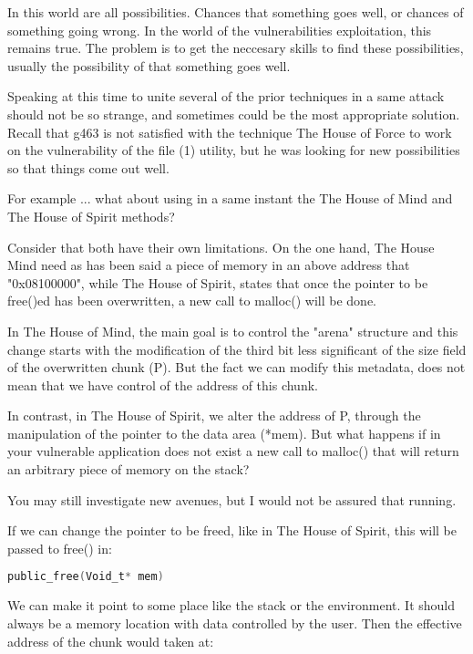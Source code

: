 \documentclass[12pt]{article}
\begin{document}
In this world are all possibilities. Chances that something goes well, or
chances of something going wrong. In the world of the vulnerabilities
exploitation, this remains true. The problem is to get the neccesary
skills to find these possibilities, usually the possibility of that
something goes well.
\newline


Speaking at this time to unite several of the prior techniques in a same
attack should not be so strange, and sometimes could be the most
appropriate solution. Recall that g463 is not satisfied with the technique
The House of Force to work on the vulnerability of the file (1) utility,
but he was looking for new possibilities so that things come out well.
\newline


For example ... what about using in a same instant the The House of Mind
and The House of Spirit methods?
\newline


Consider that both have their own limitations. On the one hand, The House
Mind need as has been said a piece of memory in an above address that
"0x08100000", while The House of Spirit, states that once the pointer to
be free()ed has been overwritten, a new call to malloc() will be done.
\newline


In The House of Mind, the main goal is to control the "arena" structure
and this change starts with the modification of the third bit less
significant of the size field of the overwritten chunk (P). But the fact
we can modify this metadata, does not mean that we have control of the
address of this chunk.
\newline


In contrast, in The House of Spirit, we alter the address of P, through
the manipulation of the pointer to the data area (*mem). But what happens
if in your vulnerable application does not exist a new call to malloc()
that will return an arbitrary piece of memory on the stack?
\newline


You may still investigate new avenues, but I would not be assured that
running.
\newline

If we can change the pointer to be freed, like in The House of Spirit,
this will be passed to free() in:
\begin{lstlisting}[language=C]
   public_free(Void_t* mem)
\end{lstlisting}
We can make it point to some place like the stack or the environment. It
should always be a memory location with data controlled by the user. Then
the effective address of the chunk would taken at:
\end{document}
